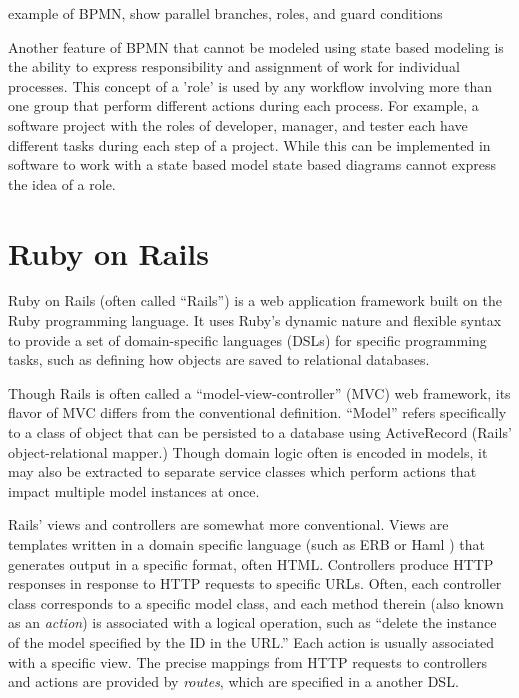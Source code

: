 \documentclass[document.tex]{subfiles}
\begin{document}
\todo example of BPMN, show parallel branches, roles, and guard conditions

Another feature of BPMN that cannot be modeled using state based modeling is the ability to express responsibility and assignment of work for individual processes. This concept of a 'role' is used by any workflow involving more than one group that perform different actions during each process. For example, a software project with the roles of developer, manager, and tester each have different tasks during each step of a project. While this can be implemented in software to work with a state based model state based diagrams cannot express the idea of a role.

\section {Ruby on Rails}

Ruby on Rails \cite{rails} (often called ``Rails'') is a web application framework built on the Ruby programming language. It uses Ruby's dynamic nature and flexible syntax to provide a set of domain-specific languages (DSLs) for specific programming tasks, such as defining how objects are saved to relational databases.

Though Rails is often called a ``model-view-controller'' (MVC) web framework, its flavor of MVC differs from the conventional definition. ``Model'' refers specifically to a class of object that can be persisted to a database using ActiveRecord (Rails' object-relational mapper.) Though domain logic often is encoded in models, it may also be extracted to separate service classes which perform actions that impact multiple model instances at once.

Rails' views and controllers are somewhat more conventional. Views are templates written in a domain specific language (such as ERB \cite{erb} or Haml \cite{haml}) that generates output in a specific format, often HTML. Controllers produce HTTP responses in response to HTTP requests to specific URLs. Often, each controller class corresponds to a specific model class, and each method therein (also known as an \emph{action}) is associated with a logical operation, such as ``delete the instance of the model specified by the ID in the URL.'' Each action is usually associated with a specific view. The precise mappings from HTTP requests to controllers and actions are provided by \emph{routes}, which are specified in a another DSL.

\end{document}
